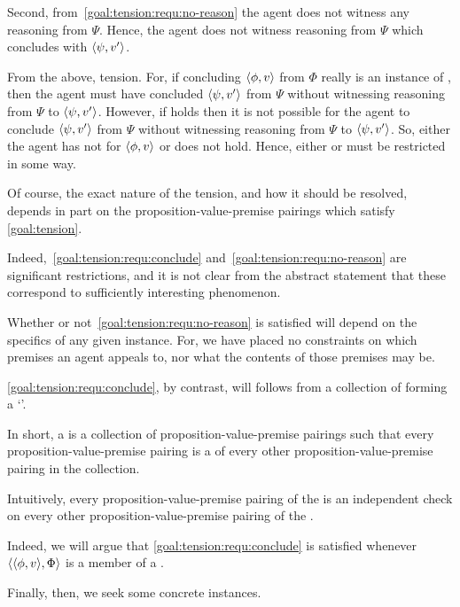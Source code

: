\begin{note}[Goal]
  Second, from~\autoref{goal:tension:requ:no-reason} the agent does not witness any reasoning from \(\Psi\).
  Hence, the agent does not witness reasoning from \(\Psi\) which concludes with \(\langle \psi, v' \rangle\).

  From the above, tension.
  For, if concluding \(\langle \phi, v \rangle\) from \(\Phi\) really is an instance of \csN{}, then the agent must have concluded \(\langle \psi, v' \rangle\) from \(\Psi\) without witnessing reasoning from \(\Psi\) to \(\langle \psi, v' \rangle\).
  However, if \ESU{} holds then it is not possible for the agent to conclude \(\langle \psi, v' \rangle\) from \(\Psi\) without witnessing reasoning from \(\Psi\) to \(\langle \psi, v' \rangle\).
  So, either the agent has not \csN{} for \(\langle \phi, v \rangle\) or \ESU{} does not hold.
  Hence, either \csN{} or \ESU{} must be restricted in some way.

  Of course, the exact nature of the tension, and how it should be resolved, depends in part on the proposition-value-premise pairings which satisfy \autoref{goal:tension}.

  Indeed,~\autoref{goal:tension:requ:conclude} and~\autoref{goal:tension:requ:no-reason} are significant restrictions, and it is not clear from the abstract statement that these correspond to sufficiently interesting phenomenon.
\end{note}

\begin{note}
  Whether or not~\autoref{goal:tension:requ:no-reason} is satisfied will depend on the specifics of any given instance.
  For, we have placed no constraints on which premises an agent appeals to, nor what the contents of those premises may be.

  \autoref{goal:tension:requ:conclude}, by contrast, will follows from a collection of  forming a `\cluster{}'.

  In short, a \cluster{} is a collection of proposition-value-premise pairings such that every proposition-value-premise pairing is a \requ{} of every other proposition-value-premise pairing in the collection.

  Intuitively, every proposition-value-premise pairing of the  is an independent check on every other proposition-value-premise pairing of the .

  Indeed, we will argue that \autoref{goal:tension:requ:conclude} is satisfied whenever \(\langle \langle \phi, v \rangle, \Phi \rangle\) is a member of a \cluster{}.

  Finally, then, we seek some concrete instances.
\end{note}

